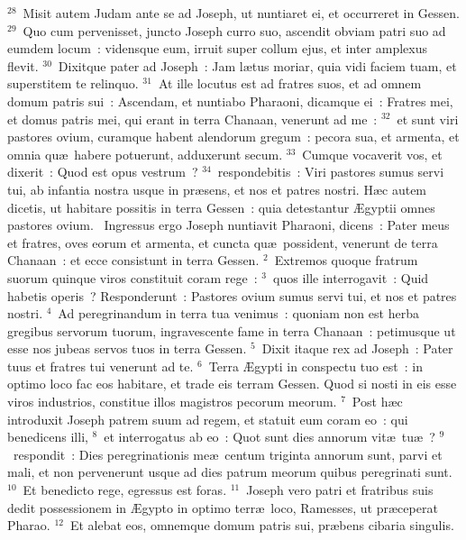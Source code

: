 ${}^{28}$~Misit autem Judam ante se ad Joseph, ut nuntiaret ei, et occurreret in Gessen.
${}^{29}$~Quo cum pervenisset, juncto Joseph curro suo, ascendit obviam patri suo ad eumdem locum~: vidensque eum, irruit super collum ejus, et inter amplexus flevit.
${}^{30}$~Dixitque pater ad Joseph~: Jam l\ae tus moriar, quia vidi faciem tuam, et superstitem te relinquo.
${}^{31}$~At ille locutus est ad fratres suos, et ad omnem domum patris sui~: Ascendam, et nuntiabo Pharaoni, dicamque ei~: Fratres mei, et domus patris mei, qui erant in terra Chanaan, venerunt ad me~:
${}^{32}$~et sunt viri pastores ovium, curamque habent alendorum gregum~: pecora sua, et armenta, et omnia qu\ae\ habere potuerunt, adduxerunt secum.
${}^{33}$~Cumque vocaverit vos, et dixerit~: Quod est opus vestrum~?
${}^{34}$~respondebitis~: Viri pastores sumus servi tui, ab infantia nostra usque in pr\ae sens, et nos et patres nostri. H\ae c autem dicetis, ut habitare possitis in terra Gessen~: quia detestantur \AE gyptii omnes pastores ovium.
~Ingressus ergo Joseph nuntiavit Pharaoni, dicens~: Pater meus et fratres, oves eorum et armenta, et cuncta qu\ae\ possident, venerunt de terra Chanaan~: et ecce consistunt in terra Gessen.
${}^{2}$~Extremos quoque fratrum suorum quinque viros constituit coram rege~:
${}^{3}$~quos ille interrogavit~: Quid habetis operis~? Responderunt~: Pastores ovium sumus servi tui, et nos et patres nostri.
${}^{4}$~Ad peregrinandum in terra tua venimus~: quoniam non est herba gregibus servorum tuorum, ingravescente fame in terra Chanaan~: petimusque ut esse nos jubeas servos tuos in terra Gessen.
${}^{5}$~Dixit itaque rex ad Joseph~: Pater tuus et fratres tui venerunt ad te.
${}^{6}$~Terra \AE gypti in conspectu tuo est~: in optimo loco fac eos habitare, et trade eis terram Gessen. Quod si nosti in eis esse viros industrios, constitue illos magistros pecorum meorum.
${}^{7}$~Post h\ae c introduxit Joseph patrem suum ad regem, et statuit eum coram eo~: qui benedicens illi,
${}^{8}$~et interrogatus ab eo~: Quot sunt dies annorum vit\ae\ tu\ae~?
${}^{9}$~respondit~: Dies peregrinationis me\ae\ centum triginta annorum sunt, parvi et mali, et non pervenerunt usque ad dies patrum meorum quibus peregrinati sunt.
${}^{10}$~Et benedicto rege, egressus est foras.
${}^{11}$~Joseph vero patri et fratribus suis dedit possessionem in \AE gypto in optimo terr\ae\ loco, Ramesses, ut pr\ae ceperat Pharao.
${}^{12}$~Et alebat eos, omnemque domum patris sui, pr\ae bens cibaria singulis.


